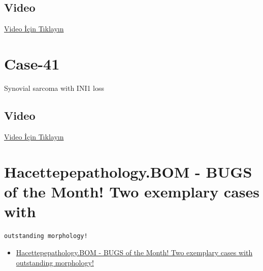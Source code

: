 \documentclass[
  letterpaper,
  DIV=11,
  numbers=noendperiod]{scrreprt}
\providecommand{\tightlist}{%
  \setlength{\itemsep}{0pt}\setlength{\parskip}{0pt}}\usepackage{longtable,booktabs,array}
\begin{document}
\hypertarget{video-38}{%
\subsection{Video}\label{video-38}}

\href{https://www.youtube.com/watch?v=In97sPfT9w4}{Video İçin Tıklayın}

\hypertarget{sec-hacettepe-com-case-41}{%
\section{Case-41}\label{sec-hacettepe-com-case-41}}

\begin{tcolorbox}[enhanced jigsaw, colbacktitle=quarto-callout-tip-color!10!white, colback=white, titlerule=0mm, opacityback=0, colframe=quarto-callout-tip-color-frame, opacitybacktitle=0.6, bottomrule=.15mm, breakable, coltitle=black, title=\textcolor{quarto-callout-tip-color}{\faLightbulb}\hspace{0.5em}{Tanı}, toprule=.15mm, toptitle=1mm, bottomtitle=1mm, arc=.35mm, rightrule=.15mm, leftrule=.75mm, left=2mm]

Synovial sarcoma with INI1 loss

\end{tcolorbox}

\hypertarget{video-39}{%
\subsection{Video}\label{video-39}}

\href{https://www.youtube.com/watch?v=1Qq67jVEfUA}{Video İçin Tıklayın}

\hypertarget{hacettepepathology.bom---bugs-of-the-month-two-exemplary-cases-with}{%
\section{Hacettepepathology.BOM - BUGS of the Month! Two exemplary cases
with}\label{hacettepepathology.bom---bugs-of-the-month-two-exemplary-cases-with}}

\begin{verbatim}
outstanding morphology!
\end{verbatim}

\begin{itemize}
\tightlist
\item
  \href{https://www.youtube.com/watch?v=hF7jSmHiiYQ\&ab_channel=KemalKosemehmetoglu}{Hacettepepathology.BOM
  - BUGS of the Month! Two exemplary cases with outstanding morphology!}
\end{itemize}
\end{document}
